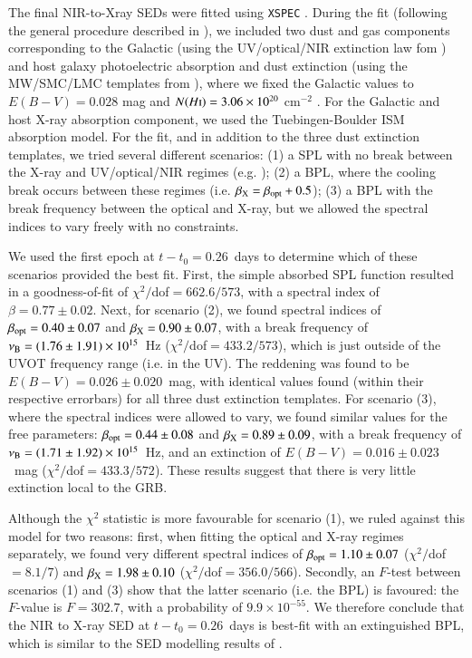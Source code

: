 \documentclass[traditabstract,longauth]{aa}
\begin{document}
The final NIR-to-Xray SEDs were fitted using \texttt{XSPEC} \citep{Arnaud96}.  During the fit (following the general procedure described in \citealt{Schady10}), we included two dust and gas components corresponding to the Galactic (using the UV/optical/NIR extinction law fom \citealt{Cardelli89}) and host galaxy photoelectric absorption \citep{Wilms2000} and dust extinction (using the MW/SMC/LMC templates from \citealt{Pei92}), where we fixed the Galactic values to $E(B-V) = 0.028$ mag and $N(H\textsc{i}) = 3.06 \times 10^{20}$ cm$^{-2}$ \citep{Willingale13}. For the Galactic and host X-ray absorption component, we used the Tuebingen-Boulder ISM absorption model.  For the fit, and in addition to the three dust extinction templates, we tried several different scenarios: (1) a SPL with no break between the X-ray and UV/optical/NIR regimes (e.g. \citealt{Zafar11}); (2) a BPL, where the cooling break occurs between these regimes (i.e. $\beta_{\rm X} = \beta_{\rm opt} + 0.5$); (3) a BPL with the break frequency between the optical and X-ray, but we allowed the spectral indices to vary freely with no constraints.

We used the first epoch at $t-t_0 = 0.26$~days to determine which of these scenarios provided the best fit.  First, the simple absorbed SPL function resulted in a goodness-of-fit of $\chi^2/$dof$ = 662.6/573$, with a spectral index of $\beta = 0.77\pm0.02$. Next, for scenario (2), we found spectral indices of $\beta_{\rm opt} = 0.40 \pm 0.07$ and $\beta_{\rm X} = 0.90 \pm 0.07$, with a break frequency of $\nu_{\rm B} = (1.76\pm1.91)\times10^{15}$~Hz ($\chi^2/$dof$ = 433.2/573$), which is just outside of the UVOT frequency range (i.e. in the UV).  The reddening was found to be $E(B-V)=0.026\pm0.020$~mag, with identical values found (within their respective errorbars) for all three dust extinction templates.  For scenario (3), where the spectral indices were allowed to vary, we found similar values for the free parameters: $\beta_{\rm opt} = 0.44 \pm 0.08$ and $\beta_{\rm X} = 0.89 \pm 0.09$, with a break frequency of $\nu_{\rm B} = (1.71\pm1.92)\times10^{15}$~Hz, and an extinction of $E(B-V)=0.016\pm0.023$~mag ($\chi^2/$dof$ = 433.3/572$).  These results suggest that there is very little extinction local to the GRB.  

Although the $\chi^2$ statistic is more favourable for scenario (1), we ruled against this model for two reasons: first, when fitting the optical and X-ray regimes separately, we found very different spectral indices of $\beta_{\rm opt} = 1.10\pm0.07$ ($\chi^2/$dof$ = 8.1/7$) and $\beta_{\rm X} = 1.98\pm0.10$ ($\chi^2/$dof$ = 356.0/566$).  Secondly, an $F$-test between scenarios (1) and (3) show that the latter scenario (i.e. the BPL) is favoured: the $F$-value is $F=302.7$, with a probability of $9.9\times10^{-55}$.  We therefore conclude that the NIR to X-ray SED at $t-t_0 = 0.26$~days is best-fit with an extinguished BPL, which is similar to the SED modelling results of \citet{Ashall17}.
\end{document}
